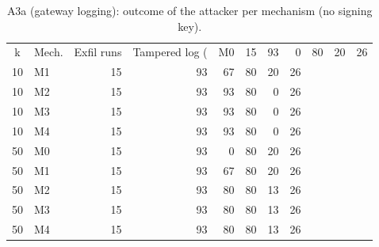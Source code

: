 \begin{table}[t]
\caption{A3a (gateway logging): outcome of the attacker per mechanism (no signing key).}
\label{tab:a3a-gateway}
\centering
\begin{tabular}{clrrrrrr}
\hline
k & Mech. & Exfil runs & Tampered log (%
 & M0 & 15 & 93 & 0 & 80 & 20 & 26 \\
10 & M1 & 15 & 93 & 67 & 80 & 20 & 26 \\
10 & M2 & 15 & 93 & 93 & 80 & 0 & 26 \\
10 & M3 & 15 & 93 & 93 & 80 & 0 & 26 \\
10 & M4 & 15 & 93 & 93 & 80 & 0 & 26 \\
50 & M0 & 15 & 93 & 0 & 80 & 20 & 26 \\
50 & M1 & 15 & 93 & 67 & 80 & 20 & 26 \\
50 & M2 & 15 & 93 & 80 & 80 & 13 & 26 \\
50 & M3 & 15 & 93 & 80 & 80 & 13 & 26 \\
50 & M4 & 15 & 93 & 80 & 80 & 13 & 26 \\
\hline
\end{tabular}
\end{table}